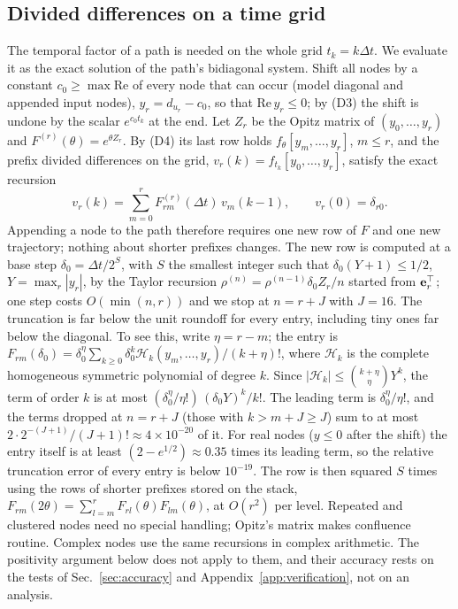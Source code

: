 \documentclass[aps,pra,superscriptaddress,floatfix,longbibliography,twocolumn]{revtex4-2}
\newcommand{\be}{{\bf e}}
\begin{document}
\subsection{Divided differences on a time grid}\label{sec:kernel}
The temporal factor of a path is needed on the whole grid $t_k=k\Delta t$. We evaluate it as the exact solution of the path's bidiagonal system. Shift all nodes by a constant $c_0\ge\max\mathrm{Re}$ of every node that can occur (model diagonal and appended input nodes), $y_r=d_{u_r}-c_0$, so that $\mathrm{Re}\,y_r\le0$; by (D3) the shift is undone by the scalar $e^{c_0t_k}$ at the end. Let $Z_r$ be the Opitz matrix of $(y_0,\dots,y_r)$ and $F^{(r)}(\theta)=e^{\theta Z_r}$. By (D4) its last row holds $f_\theta[y_m,\dots,y_r]$, $m\le r$, and the prefix divided differences on the grid,
$v_r(k)=f_{t_k}[y_0,\dots,y_r]$, satisfy the exact recursion
\begin{equation}\label{eq:traj}
v_r(k)=\sum_{m=0}^{r}F^{(r)}_{rm}(\Delta t)\,v_m(k-1),\qquad v_r(0)=\delta_{r0}.
\end{equation}
Appending a node to the path therefore requires one new row of $F$ and one new trajectory; nothing about shorter prefixes changes. The new row is computed at a base step $\delta_0=\Delta t/2^S$, with $S$ the smallest integer such that $\delta_0(Y+1)\le1/2$, $Y=\max_r|y_r|$, by the Taylor recursion $\rho^{(n)}=\rho^{(n-1)}\delta_0Z_r/n$ started from $\be_r^\top$; one step costs $O(\min(n,r))$ and we stop at $n=r+J$ with $J=16$. The truncation is far below the unit roundoff for every entry, including tiny ones far below the diagonal. To see this, write $\eta=r-m$; the entry is $F_{rm}(\delta_0)=\delta_0^{\eta}\sum_{k\ge0}\delta_0^k \mathcal{H}_k(y_m,\dots,y_r)/(k+\eta)!$, where $\mathcal{H}_k$ is the complete homogeneous symmetric polynomial of degree $k$. Since $|\mathcal{H}_k|\le\binom{k+\eta}{\eta}Y^k$, the term of order $k$ is at most $(\delta_0^\eta/\eta!)\,(\delta_0Y)^k/k!$. The leading term is $\delta_0^\eta/\eta!$, and the terms dropped at $n=r+J$ (those with $k>m+J\ge J$) sum to at most $2\cdot2^{-(J+1)}/(J+1)!\approx4\times10^{-20}$ of it. For real nodes ($y\le0$ after the shift) the entry itself is at least $(2-e^{1/2})\approx0.35$ times its leading term, so the relative truncation error of every entry is below $10^{-19}$. The row is then squared $S$ times using the rows of shorter prefixes stored on the stack, $F_{rm}(2\theta)=\sum_{l=m}^{r}F_{rl}(\theta)F_{lm}(\theta)$, at $O(r^2)$ per level. Repeated and clustered nodes need no special handling; Opitz's matrix makes confluence routine. Complex nodes use the same recursions in complex arithmetic. The positivity argument below does not apply to them, and their accuracy rests on the tests of Sec.~\ref{sec:accuracy} and Appendix~\ref{app:verification}, not on an analysis.
\end{document}
